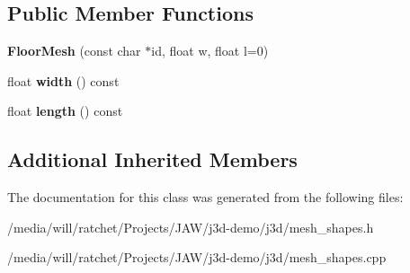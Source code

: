\subsection*{Public Member Functions}
\begin{DoxyCompactItemize}
\item 
\hypertarget{classj3d_1_1FloorMesh_a6fedbd345f7b9e35c31dacfdb5d7ad06}{}{\bfseries Floor\+Mesh} (const char $\ast$id, float w, float l=0)\label{classj3d_1_1FloorMesh_a6fedbd345f7b9e35c31dacfdb5d7ad06}

\item 
\hypertarget{classj3d_1_1FloorMesh_a1af3571a2f3b2bd06d7d6170a66052a6}{}float {\bfseries width} () const \label{classj3d_1_1FloorMesh_a1af3571a2f3b2bd06d7d6170a66052a6}

\item 
\hypertarget{classj3d_1_1FloorMesh_aa47a3ce7815913cbc107ddf0a6073668}{}float {\bfseries length} () const \label{classj3d_1_1FloorMesh_aa47a3ce7815913cbc107ddf0a6073668}

\end{DoxyCompactItemize}
\subsection*{Additional Inherited Members}


The documentation for this class was generated from the following files\+:\begin{DoxyCompactItemize}
\item 
/media/will/ratchet/\+Projects/\+J\+A\+W/j3d-\/demo/j3d/mesh\+\_\+shapes.\+h\item 
/media/will/ratchet/\+Projects/\+J\+A\+W/j3d-\/demo/j3d/mesh\+\_\+shapes.\+cpp\end{DoxyCompactItemize}
